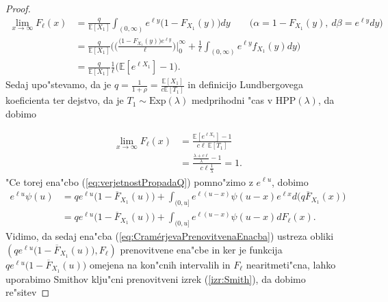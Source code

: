 \documentclass[12pt, a4paper, reqno]{amsart}
\theoremstyle{definition}
\theoremstyle{plain}
\newcommand{\E}{\mathbb{E}}
\newcommand{\1}{\mathds{1}}
\begin{document}
\begin{proof}
                \begin{align*}
                    \lim_{x\to\infty}F_\ell(x) &= \frac{q}{\E\left[X_1\right]}\int_{(0, \infty)}e^{\ell y} \bigl(1 - F_{X_1}(y)\bigr)dy \qquad \bigl(\alpha = 1 - F_{X_1}(y), \ d\beta = e^{\ell y}dy\bigr)\\
                                               &= \frac{q}{\E\left[X_1\right]}\biggl(\biggl(\frac{\bigl(1 - F_{X_1}(y)\bigr)e^{\ell y}}{\ell}\biggr)\Big|_{0}^{\infty} + \frac{1}{\ell}\int_{(0, \infty)}e^{\ell y}f_{X_1}(y)dy\biggr) \\
                                               &= \frac{q}{\E\left[X_1\right]}\frac{1}{\ell}\biggl(\E\left[e^{\ell X_1}\right] - 1\biggr).
                \end{align*}
                Sedaj upo"stevamo, da je $q = \frac{1}{1 + \rho} = \frac{\E\left[X_1\right]}{c\E\left[T_1\right]}$ in 
                definicijo Lundbergovega koeficienta ter dejstvo, da je $T_1\sim\text{Exp}(\lambda)$ medprihodni "cas v $\text{HPP}(\lambda)$, da dobimo

                \begin{align*}
                    \lim_{x\to\infty}F_\ell(x)  &= \frac{\E\left[e^{\ell X_1}\right] - 1}{c\ell\ \E\left[T_1\right]}\\
                                                &= \frac{\frac{\lambda + c\ell}{\lambda} - 1}{c\ell \frac{1}{\lambda}} = 1.
                \end{align*}
                "Ce torej ena"cbo (\ref{eq:verjetnostPropadaQ}) pomno"zimo z $e^{\ell u}$, dobimo
                \begin{align}
                    e^{\ell u}\psi(u)   &= qe^{\ell u}\bigl(1 - \overline{F}_{X_1}(u)\bigr) + \int_{(0, u]}e^{\ell (u - x)}\psi(u - x)e^{\ell x}d\bigl(q\overline{F}_{X_1}(x)\bigr) \nonumber \\
                                        &= qe^{\ell u}\bigl(1 - \overline{F}_{X_1}(u)\bigr) + \int_{(0, u]}e^{\ell (u - x)}\psi(u - x)dF_\ell(x). \label{eq:CramérjevaPrenovitvenaEnacba}
                \end{align}
                Vidimo, da sedaj ena"cba (\ref{eq:CramérjevaPrenovitvenaEnacba}) ustreza obliki $\left(qe^{\ell u}\bigl(1 - \overline{F}_{X_1}(u)\bigr), F_\ell\right)$
                prenovitvene ena"cbe in ker je funkcija $qe^{\ell u}\bigl(1 - \overline{F}_{X_1}(u)\bigr)$ omejena na kon"cnih 
                intervalih in $F_\ell$ nearitmeti"cna, lahko uporabimo Smithov klju"cni prenovitveni izrek (\ref{izr:Smith}), da dobimo
                re"sitev
                

\end{proof}
\end{document}
